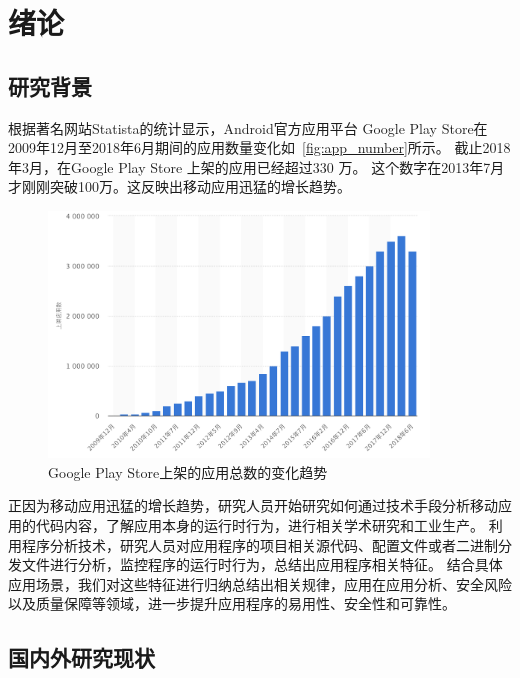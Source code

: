 \chapter {绪论}
\label{chp:intro}

\section{研究背景}

根据著名网站Statista的统计\cite{GoogleP55:online}显示，Android官方应用平台 Google Play Store在2009年12月至2018年6月期间的应用数量变化如~\autoref{fig:app_number}所示。
截止2018年3月，在Google Play Store 上架的应用已经超过330 万。
这个数字在2013年7月才刚刚突破100万。这反映出移动应用迅猛的增长趋势。

\begin{figure}[h]
	\centering
	\includegraphics[width=0.9\textwidth]{./Figures/app-numbers.png}
	\caption{Google Play Store上架的应用总数的变化趋势}
	\label{fig:app_number}
\end{figure}





正因为移动应用迅猛的增长趋势，研究人员开始研究如何通过技术手段分析移动应用的代码内容，了解应用本身的运行时行为，进行相关学术研究和工业生产。
利用程序分析技术，研究人员对应用程序的项目相关源代码、配置文件或者二进制分发文件进行分析，监控程序的运行时行为，总结出应用程序相关特征。
结合具体应用场景，我们对这些特征进行归纳总结出相关规律，应用在应用分析、安全风险以及质量保障等领域，进一步提升应用程序的易用性、安全性和可靠性。


\section{国内外研究现状}
